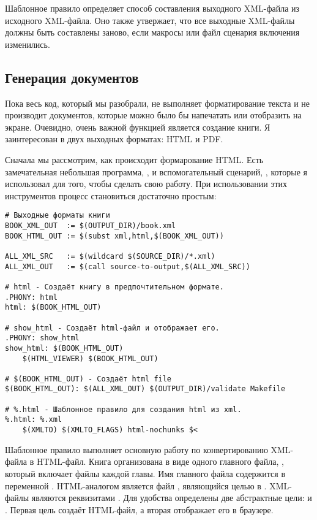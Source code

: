 Шаблонное правило определяет способ составления выходного XML-файла из
исходного XML-файла. Оно также утвержает, что все выходные XML-файлы
должны быть составлены заново, если макросы или файл сценария
включения изменились.

\subsection{Генерация документов}

Пока весь код, который мы разобрали, не выполняет форматирование
текста и не производит документов, которые можно было бы напечатать
или отобразить на экране. Очевидно, очень важной функцией 
является создание книги. Я заинтересован в двух выходных форматах:
HTML и PDF.

Сначала мы рассмотрим, как происходит формарование HTML. Есть
замечательная небольшая программа, , и
вспомогательный сценарий, , которые я использовал для
того, чтобы сделать свою работу. При использовании этих инструментов
процесс становиться достаточно простым:

\begin{verbatim}
# Выходные форматы книги
BOOK_XML_OUT  := $(OUTPUT_DIR)/book.xml
BOOK_HTML_OUT := $(subst xml,html,$(BOOK_XML_OUT))

ALL_XML_SRC   := $(wildcard $(SOURCE_DIR)/*.xml)
ALL_XML_OUT   := $(call source-to-output,$(ALL_XML_SRC))

# html - Создаёт книгу в предпочтительном формате.
.PHONY: html
html: $(BOOK_HTML_OUT)

# show_html - Создаёт html-файл и отображает его.
.PHONY: show_html
show_html: $(BOOK_HTML_OUT)
    $(HTML_VIEWER) $(BOOK_HTML_OUT)

# $(BOOK_HTML_OUT) - Создаёт html file
$(BOOK_HTML_OUT): $(ALL_XML_OUT) $(OUTPUT_DIR)/validate Makefile

# %.html - Шаблонное правило для создания html из xml.
%.html: %.xml
    $(XMLTO) $(XMLTO_FLAGS) html-nochunks $<
\end{verbatim}

Шаблонное правило выполняет основную работу по конвертированию
XML-файла в HTML-файл. Книга организована в виде одного главного
файла, , который включает файлы каждой главы. Имя
главного файла содержится в переменной
. HTML-аналогом является файл
, являющийся целью в . XML-файлы
являются реквизитами . Для удобства
определены две абстрактные цели:  и .
Первая цель создаёт HTML-файл, а вторая отображает его в браузере.


